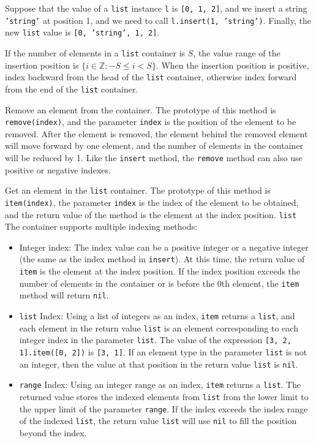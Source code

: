Suppose that the value of a \texttt{list} instance \texttt{l} is \texttt{[0, 1, 2]}, and we insert a string \texttt{'string'} at position 1, and we need to call \texttt{l.insert(1, 'string')}. Finally, the new \texttt{list} value is \texttt{[0, 'string', 1, 2]}.

If the number of elements in a \texttt{list} container is $S$, the value range of the insertion position is $\{i \in \mathbb{Z}: -S\leqslant i<S\}$. When the insertion position is positive, index backward from the head of the \texttt{list} container, otherwise index forward from the end of the \texttt{list} container.


Remove an element from the container. The prototype of this method is \texttt{remove(index)}, and the parameter \texttt{index} is the position of the element to be removed. After the element is removed, the element behind the removed element will move forward by one element, and the number of elements in the container will be reduced by 1. Like the \texttt{insert} method, the \texttt{remove} method can also use positive or negative indexes.


Get an element in the \texttt{list} container. The prototype of this method is \texttt{item(index)}, the parameter \texttt{index} is the index of the element to be obtained, and the return value of the method is the element at the index position. \texttt{list} The container supports multiple indexing methods:

\begin{itemize}
    \item Integer index: The index value can be a positive integer or a negative integer (the same as the index method in \texttt{insert}). At this time, the return value of \texttt{item} is the element at the index position. If the index position exceeds the number of elements in the container or is before the 0th element, the \texttt{item} method will return \texttt{nil}.
    \item \texttt{list} Index: Using a list of integers as an index, \texttt{item} returns a \texttt{list}, and each element in the return value \texttt{list} is an element corresponding to each integer index in the parameter \texttt{list}. The value of the expression \texttt{[3, 2, 1].item([0, 2])} is \texttt{[3, 1]}. If an element type in the parameter \texttt{list} is not an integer, then the value at that position in the return value \texttt{list} is \texttt{nil}.
    \item \texttt{range} Index: Using an integer range as an index, \texttt{item} returns a \texttt{list}. The returned value stores the indexed elements from \texttt{list} from the lower limit to the upper limit of the parameter \texttt{range}. If the index exceeds the index range of the indexed \texttt{list}, the return value \texttt{list} will use \texttt{nil} to fill the position beyond the index.
\end{itemize}


